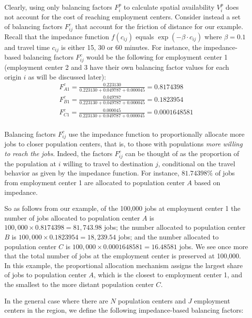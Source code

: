 \documentclass[]{elsarticle} %
\begin{document}
Clearly, using only balancing factors \(F^p_{i}\) to calculate spatial
availability \(V^p_i\) does not account for the cost of reaching
employment centers. Consider instead a set of balancing factors
\(F^c_{ij}\) that account for the friction of distance for our example.
Recall that the impedance function \(f(c_{ij})\) equals
\(\exp(-\beta\cdot c_{ij})\) where \(\beta = 0.1\) and travel time
\(c_{ij}\) is either 15, 30 or 60 minutes. For instance, the
impedance-based balancing factors \(F^c_{ij}\) would be the following
for employment center 1 (employment center 2 and 3 have their own
balancing factor values for each origin \(i\) as will be discussed
later): \[
\begin{array}{l}
F^c_{A1} = \frac{0.223130}{0.223130 + 0.049787 + 0.000045} = 0.8174398\\
F^c_{B1} = \frac{0.049787}{0.223130 + 0.049787 + 0.000045} = 0.1823954\\
F^c_{C1} = \frac{0.000045}{0.223130 + 0.049787 + 0.000045} = 0.0001648581\\
\end{array}
\]

Balancing factors \(F^c_{ij}\) use the impedance function to
proportionally allocate more jobs to closer population centers, that is,
to those with populations \emph{more willing to reach the jobs}. Indeed,
the factors \(F^c_{ij}\) can be thought of as the proportion of the
population at \(i\) willing to travel to destination \(j\), conditional
on the travel behavior as given by the impedance function. For instance,
\({81.74398}\%\) of jobs from employment center 1 are allocated to
population center \(A\) based on impedance.

So as follows from our example, of the 100,000 jobs at employment center
1 the number of jobs allocated to population center \(A\) is
\(100,000\times 0.8174398 = 81,743.98\) jobs; the number allocated to
population center \(B\) is \(100,000\times 0.1823954 = 18,239.54\) jobs;
and the number allocated to population center \(C\) is
\(100,000\times 0.0001648581 = 16.48581\) jobs. We see once more that
the total number of jobs at the employment center is preserved at
100,000. In this example, the proportional allocation mechanism assigns
the largest share of jobs to population center \(A\), which is the
closest to employment center 1, and the smallest to the more distant
population center \(C\).

In the general case where there are \(N\) population centers and \(J\)
employment centers in the region, we define the following
impedance-based balancing factors:
\end{document}
